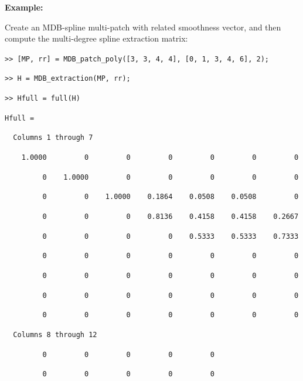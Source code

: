 \documentclass[10pt]{./acmtrans2e}
\newenvironment{example}
{\vspace*{0.1cm}
\noindent \textbf{Example:} \vspace*{0.15cm}

\setlength{\parskip}{0.5ex plus 0.5exminus 0.2 ex}
}
{\medskip
}
\begin{document}
\begin{example}
\noindent Create an MDB-spline multi-patch with related smoothness vector, and then compute the multi-degree spline extraction matrix:
\medskip

\texttt{>> [MP, rr] = MDB\_patch\_poly([3, 3, 4, 4], [0, 1, 3, 4, 6], 2);}

\texttt{>> H = MDB\_extraction(MP, rr);}

\texttt{>> Hfull = full(H)}

\pagebreak

\texttt{Hfull =}

\texttt{\ \ Columns 1 through 7}

\texttt{\ \ \ \ 1.0000\ \ \ \ \ \ \ \ \ 0\ \ \ \ \ \ \ \ \ 0\ \ \ \ \ \ \ \ \ 0\ \ \ \ \ \ \ \ \ 0\ \ \ \ \ \ \ \ \ 0\ \ \ \ \ \ \ \ \ 0}

\texttt{\ \ \ \ \ \ \ \ \ 0\ \ \ \ 1.0000\ \ \ \ \ \ \ \ \ 0\ \ \ \ \ \ \ \ \ 0\ \ \ \ \ \ \ \ \ 0\ \ \ \ \ \ \ \ \ 0\ \ \ \ \ \ \ \ \ 0}

\texttt{\ \ \ \ \ \ \ \ \ 0\ \ \ \ \ \ \ \ \ 0\ \ \ \ 1.0000\ \ \ \ 0.1864\ \ \ \ 0.0508\ \ \ \ 0.0508\ \ \ \ \ \ \ \ \ 0}

\texttt{\ \ \ \ \ \ \ \ \ 0\ \ \ \ \ \ \ \ \ 0\ \ \ \ \ \ \ \ \ 0\ \ \ \ 0.8136\ \ \ \ 0.4158\ \ \ \ 0.4158\ \ \ \ 0.2667}

\texttt{\ \ \ \ \ \ \ \ \ 0\ \ \ \ \ \ \ \ \ 0\ \ \ \ \ \ \ \ \ 0\ \ \ \ \ \ \ \ \ 0\ \ \ \ 0.5333\ \ \ \ 0.5333\ \ \ \ 0.7333}

\texttt{\ \ \ \ \ \ \ \ \ 0\ \ \ \ \ \ \ \ \ 0\ \ \ \ \ \ \ \ \ 0\ \ \ \ \ \ \ \ \ 0\ \ \ \ \ \ \ \ \ 0\ \ \ \ \ \ \ \ \ 0\ \ \ \ \ \ \ \ \ 0}

\texttt{\ \ \ \ \ \ \ \ \ 0\ \ \ \ \ \ \ \ \ 0\ \ \ \ \ \ \ \ \ 0\ \ \ \ \ \ \ \ \ 0\ \ \ \ \ \ \ \ \ 0\ \ \ \ \ \ \ \ \ 0\ \ \ \ \ \ \ \ \ 0}

\texttt{\ \ \ \ \ \ \ \ \ 0\ \ \ \ \ \ \ \ \ 0\ \ \ \ \ \ \ \ \ 0\ \ \ \ \ \ \ \ \ 0\ \ \ \ \ \ \ \ \ 0\ \ \ \ \ \ \ \ \ 0\ \ \ \ \ \ \ \ \ 0}

\texttt{\ \ \ \ \ \ \ \ \ 0\ \ \ \ \ \ \ \ \ 0\ \ \ \ \ \ \ \ \ 0\ \ \ \ \ \ \ \ \ 0\ \ \ \ \ \ \ \ \ 0\ \ \ \ \ \ \ \ \ 0\ \ \ \ \ \ \ \ \ 0}

\texttt{\ \ Columns 8 through 12}

\texttt{\ \ \ \ \ \ \ \ \ 0\ \ \ \ \ \ \ \ \ 0\ \ \ \ \ \ \ \ \ 0\ \ \ \ \ \ \ \ \ 0\ \ \ \ \ \ \ \ \ 0}

\texttt{\ \ \ \ \ \ \ \ \ 0\ \ \ \ \ \ \ \ \ 0\ \ \ \ \ \ \ \ \ 0\ \ \ \ \ \ \ \ \ 0\ \ \ \ \ \ \ \ \ 0}


\end{example}
\end{document}
